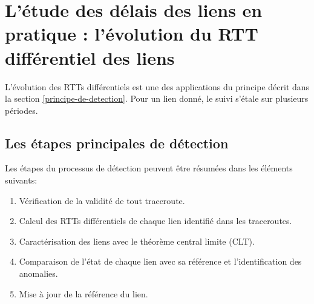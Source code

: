 


\section{L'étude des délais des liens en pratique : l'évolution du RTT différentiel des liens}

L'évolution des RTTs différentiels est une des applications du principe décrit dans la section  \ref{principe-de-detection}. Pour un lien donné, le suivi s'étale sur plusieurs  périodes.  


\subsection{Les étapes principales de détection} \label{steps:detection}
Les étapes du processus de détection peuvent être résumées dans les éléments suivants:

\begin{enumerate}[label=(\roman*)]
	
	\item Vérification de la validité de tout traceroute.
	
	\item Calcul des RTTs différentiels de chaque lien identifié dans les traceroutes.

	\item Caractérisation des liens avec le théorème central limite (CLT).
	
	\item  Comparaison de l'état de chaque lien avec sa référence  et l'identification des anomalies.

	\item Mise à jour de la référence du lien.
\end{enumerate}
